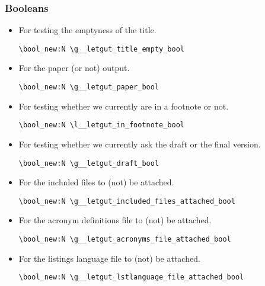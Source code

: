 \documentclass{letgut}
\begin{document}
\subsubsection{Booleans}
\label{ImplementationDeclarationsBooleans-s09g55h0jlj0}
\begin{itemize}
\item For testing the emptyness of the title.
\begin{lstlisting}
\bool_new:N \g__letgut_title_empty_bool
\end{lstlisting}
\item For the paper (or not) output.
\begin{lstlisting}
\bool_new:N \g__letgut_paper_bool
\end{lstlisting}
\item For testing whether we currently are in a footnote or not.
\begin{lstlisting}
\bool_new:N \l__letgut_in_footnote_bool
\end{lstlisting}
\item For testing whether we currently ask the draft or the final version.
\begin{lstlisting}
\bool_new:N \g__letgut_draft_bool
\end{lstlisting}
\item For the included files to (not) be attached.
\begin{lstlisting}
\bool_new:N \g__letgut_included_files_attached_bool
\end{lstlisting}
\item For the acronym definitions file to (not) be attached.
\begin{lstlisting}
\bool_new:N \g__letgut_acronyms_file_attached_bool
\end{lstlisting}
\item For the listings language file to (not) be attached.
\begin{lstlisting}
\bool_new:N \g__letgut_lstlanguage_file_attached_bool
\end{lstlisting}
\end{itemize}
\end{document}
